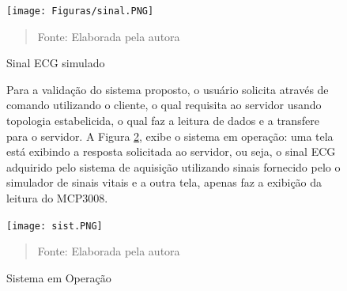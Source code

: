 \begin{figure}[H]
\begin{center}
			\caption{Sinal ECG simulado}
			\texttt{[image: Figuras/sinal.PNG]}
                          						\vspace*{\fill} 
            \begin{quote} 
            \centering 
           Fonte: Elaborada pela autora
            \end{quote}
            \vspace*{\fill}
			\label{fig:ecg2}
\end{center}
\end{figure}
\begin{figure}[H]

\hspace*{0.8cm}Para a validação do sistema proposto, o usuário solicita através de comando utilizando o cliente, o qual requisita ao servidor usando topologia estabelicida, o qual faz a leitura de dados e a transfere para o servidor. A Figura \ref{fig:syst}, exibe o sistema em operação: uma tela está exibindo a resposta solicitada ao servidor, ou seja, o sinal ECG adquirido pelo sistema de aquisição utilizando sinais fornecido pelo o  simulador de sinais vitais e a outra tela, apenas faz a exibição da leitura do MCP3008.

\begin{center}
			\caption{Sistema em Operação}
			\texttt{[image: sist.PNG]}
            	\vspace*{\fill} 
            \begin{quote} 
            \centering 
           Fonte: Elaborada pela autora
            \end{quote}
            \vspace*{\fill}
			\label{fig:syst}
\end{center}
\end{figure}